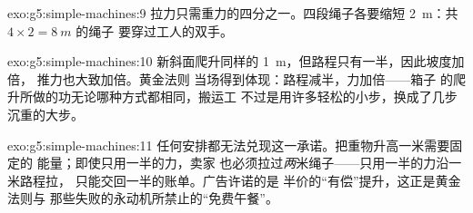 \begin{solution}{exo:g5:simple-machines:9}
拉力只需重力的四分之一。四段绳子各要缩短
\qty{2}{m}：共 $4 \times 2 = \qty{8}{m}$ 的绳子
要穿过工人的双手。
\end{solution}

\begin{solution}{exo:g5:simple-machines:10}
新斜面爬升同样的 \qty{1}{m}，但路程只有一半，因此坡度加倍，
推力也大致加倍。黄金法则
当场得到体现：路程减半，力加倍——箱子
的爬升所做的功无论哪种方式都相同，搬运工
不过是用许多轻松的小步，换成了几步沉重的大步。
\end{solution}

\begin{solution}{exo:g5:simple-machines:11}
任何安排都无法兑现这一承诺。把重物升高一米需要固定的
能量；即使只用一半的力，卖家
也必须拉过\emph{两}米绳子——只用一半的力沿一米路程拉，
只能交回一半的账单。广告许诺的是
半价的“有偿”提升，这正是黄金法则与
那些失败的永动机所禁止的“免费午餐”。
\end{solution}
